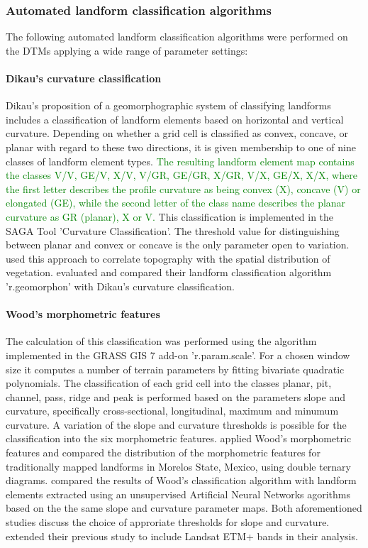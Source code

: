 \documentclass[preprint,12pt,authoryear]{elsarticle}
\begin{document}
\subsubsection{Automated landform classification algorithms}
 The following automated landform classification algorithms were performed on the DTMs applying a wide range of parameter settings:
\paragraph{Dikau's curvature classification \citep{Dikau1988}}
Dikau's proposition of a geomorphographic system of classifying landforms includes a classification of landform elements based on horizontal and vertical curvature. Depending on whether a grid cell is classified as convex, concave, or  planar with regard to these two directions, it is given membership to one of nine classes of landform element types. \textcolor{green}{The resulting landform element map contains the classes V/V, GE/V, X/V, V/GR, GE/GR, X/GR, V/X, GE/X, X/X, where the first letter describes the profile curvature as being convex (X), concave (V) or elongated (GE), while the second letter of the class name describes the planar curvature as GR (planar), X or V.} This classification is implemented in the SAGA Tool 'Curvature Classification'. The threshold value for distinguishing between planar and convex or concave is the only parameter open to variation. \cite{Hoersch2002} used this approach to correlate topography with the spatial distribution of vegetation. \cite{Jasiewicz2013} evaluated and compared their landform classification algorithm 'r.geomorphon' with Dikau's curvature classification. 
\paragraph{Wood's morphometric features \citep{Wood1996}}
The calculation of this classification was performed using the algorithm implemented in the GRASS GIS 7  add-on 'r.param.scale'.  For a chosen window size it computes a number of terrain parameters by fitting bivariate quadratic polynomials.  The classification of each grid cell into the classes planar, pit, channel, pass, ridge and peak is performed based on the parameters slope and curvature, specifically cross-sectional, longitudinal, maximum and minumum curvature. A variation of  the slope and curvature thresholds is possible for the classification into the six morphometric features.
\cite{Bolongaro-Crevenna2005} applied Wood's morphometric features and compared the distribution of the morphometric features for traditionally mapped landforms in Morelos State, Mexico, using double ternary diagrams. \cite{Ehsani2008} compared the results of Wood's classification algorithm with landform elements extracted using  an unsupervised Artificial Neural Networks agorithms based on the the same slope and curvature parameter maps. Both aforementioned studies discuss the choice of approriate thresholds for slope and curvature. \cite{Ehsani2009} extended their previous study  to include Landsat ETM+ bands in their analysis.  
\end{document}
